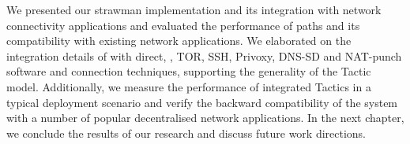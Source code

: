 We presented our strawman \signpost implementation and its  integration with
network connectivity applications and evaluated the performance of \signpost
paths and its compatibility with existing network applications. We elaborated on
the integration details of \signpost  with direct, \openvpn, TOR, SSH, Privoxy,
DNS-SD and NAT-punch software and connection techniques, supporting  the
generality of the \signpost Tactic model. Additionally, we measure the
performance of integrated Tactics in a typical deployment scenario and verify
the backward compatibility of the system with a number of popular decentralised
network applications. In the next chapter, we conclude the results of our research and
discuss future work directions.


